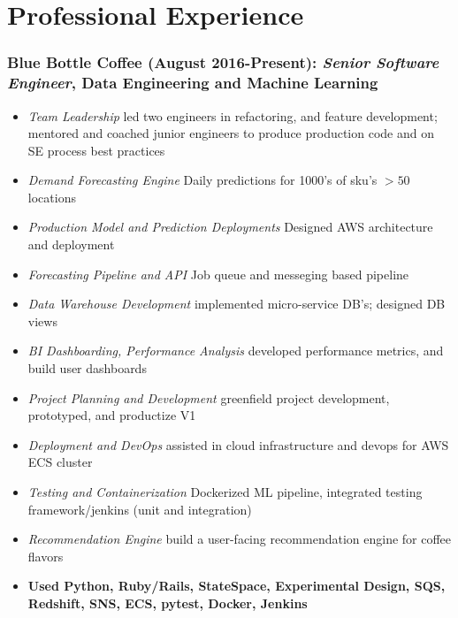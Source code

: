 \documentclass[a4paper,10pt,notitlepage]{article}
\begin{document}
\vspace{-10pt}\section*{Professional Experience}

\subsubsection*{Blue Bottle Coffee (August 2016-Present): \textit{Senior Software Engineer}, Data Engineering and Machine Learning}
  \begin{itemize}
    \vspace{-5pt}\item  \textit{Team Leadership} led two engineers in refactoring, and feature development; mentored and coached junior engineers to produce production code and on SE process best practices
    \vspace{-5pt}\item  \textit{Demand Forecasting Engine} Daily predictions for 1000's of sku's $>50$ locations
    \vspace{-5pt}\item  \textit{Production Model and Prediction Deployments} Designed AWS architecture and deployment
    \vspace{-5pt}\item  \textit{Forecasting Pipeline and API} Job queue and messeging based pipeline
    \vspace{-5pt}\item  \textit{Data Warehouse Development} implemented micro-service DB's; designed DB views
    \vspace{-5pt}\item  \textit{BI Dashboarding, Performance Analysis} developed performance metrics, and build user dashboards
    \vspace{-5pt}\item  \textit{Project Planning and Development} greenfield project development, prototyped, and productize V1
    \vspace{-5pt}\item  \textit{Deployment and DevOps} assisted in cloud infrastructure and devops for AWS ECS cluster
    \vspace{-5pt}\item  \textit{Testing and Containerization} Dockerized ML pipeline, integrated testing framework/jenkins (unit and integration)
    \vspace{-5pt}\item  \textit{Recommendation Engine} build a user-facing recommendation engine for coffee flavors
    \vspace{-5pt}\item  \textbf{Used Python, Ruby/Rails, StateSpace, Experimental Design, SQS, Redshift, SNS, ECS, pytest, Docker, Jenkins}
  \end{itemize}
\end{document}
